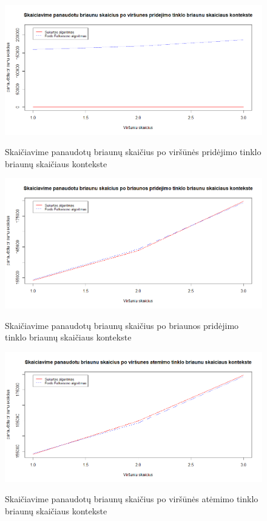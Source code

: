 \begin{figure}[H]
	\caption{Skaičiavime panaudotų briaunų skaičius po viršūnės pridėjimo tinklo briaunų skaičiaus kontekste}
	\centering
	\includegraphics[width=\textwidth]{img/eav.png}
	\label{plot:eav}
\end{figure}
\begin{figure}[H]
	\caption{Skaičiavime panaudotų briaunų skaičius po briaunos pridėjimo tinklo briaunų skaičiaus kontekste}
	\centering
	\includegraphics[width=\textwidth]{img/eae.png}
	\label{plot:eae}
\end{figure}
\begin{figure}[H]
	\caption{Skaičiavime panaudotų briaunų skaičius po viršūnės atėmimo tinklo briaunų skaičiaus kontekste}
	\centering
	\includegraphics[width=\textwidth]{img/erv.png}
	\label{plot:erv}
\end{figure}
